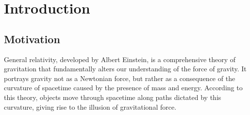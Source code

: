 
\chapter{Introduction}
\label{chapter:introduction}

\section{Motivation}
\label{section:motivation}

General relativity, developed by Albert Einstein, is a comprehensive theory of gravitation that fundamentally alters our understanding of the force of gravity. It portrays gravity not as a Newtonian force, but rather as a consequence of the curvature of spacetime caused by the presence of mass and energy. According to this theory, objects move through spacetime along paths dictated by this curvature, giving rise to the illusion of gravitational force.

